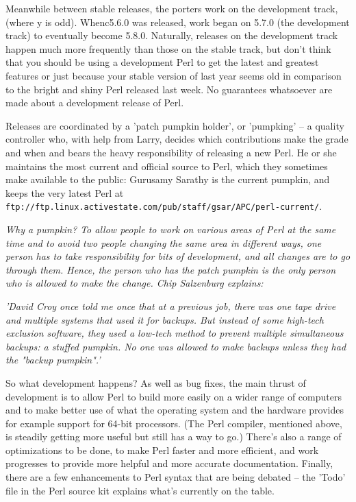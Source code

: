 \documentclass[a4paper,11pt]{book}
\begin{document}
\noindent 

\noindent Meanwhile between stable releases, the porters work on the development track, (where y is odd). Whenc5.6.0 was released, work began on 5.7.0 (the development track) to eventually become 5.8.0. Naturally, releases on the development track happen much more frequently than those on the stable track, but don't think that you should be using a development Perl to get the latest and greatest features or just because your stable version of last year seems old in comparison to the bright and shiny Perl released last week. No guarantees whatsoever are made about a development release of Perl.

\noindent 

\noindent Releases are coordinated by a 'patch pumpkin holder', or 'pumpking' -- a quality controller who, with help from Larry, decides which contributions make the grade and when and bears the heavy responsibility of releasing a new Perl. He or she maintains the most current and official source to Perl, which they sometimes make available to the public: Gurusamy Sarathy is the current pumpkin, and keeps the very latest Perl at \texttt{ftp://ftp.linux.activestate.com/pub/staff/gsar/APC/perl-current/}.

\noindent 

\textit{Why a pumpkin? To allow people to work on various areas of Perl at the same time and to avoid two people changing the same area in different ways, one person has to take responsibility for bits of development, and all changes are to go through them. Hence, the person who has the patch pumpkin is the only person who is allowed to make the change. Chip Salzenburg explains:}

\noindent \textit{'David Croy once told me once that at a previous job, there was one tape drive and multiple systems that used it for backups. But instead of some high-tech exclusion software, they used a low-tech method to prevent multiple simultaneous backups: a stuffed pumpkin. No one was allowed to make backups unless they had the "backup pumpkin".'}

\noindent 

\noindent So what development happens? As well as bug fixes, the main thrust of development is to allow Perl to build more easily on a wider range of computers and to make better use of what the operating system and the hardware provides for example support for 64-bit processors. (The Perl compiler, mentioned above, is steadily getting more useful but still has a way to go.) There's also a range of optimizations to be done, to make Perl faster and more efficient, and work progresses to provide more helpful and more accurate documentation. Finally, there are a few enhancements to Perl syntax that are being debated -- the 'Todo' file in the Perl source kit explains what's currently on the table.
\end{document}
